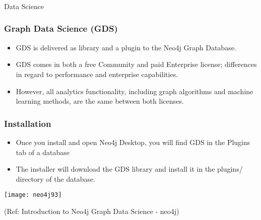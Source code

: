 \begin{frame}[fragile]\frametitle{}
\begin{center}
{\Large Data Science}
\end{center}
\end{frame}

\begin{frame}[fragile]\frametitle{Graph Data Science (GDS)}
\begin{itemize}
\item GDS is delivered as library and a plugin to the Neo4j Graph Database. 
\item GDS comes in both a free Community and paid Enterprise license; differences in regard to performance and enterprise capabilities. 
\item However, all analytics functionality, including graph algorithms and machine learning methods, are the same between both licenses.
\end{itemize}

\end{frame}

\begin{frame}[fragile]\frametitle{Installation}

\begin{itemize}
\item Once you install and open Neo4j Desktop, you will find GDS in the Plugins tab of a database
\item The installer will download the GDS library and install it in the plugins/ directory of the database. 
\end{itemize}

\begin{center}
\texttt{[image: neo4j93]}
\end{center}	

{\tiny (Ref: Introduction to Neo4j Graph Data Science - neo4j)}
\end{frame}

